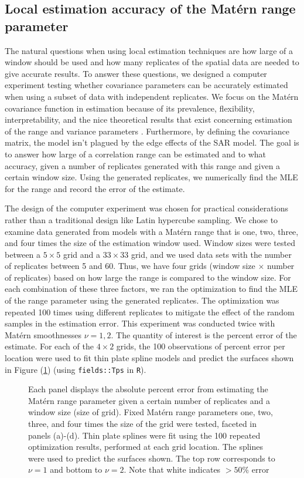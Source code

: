 \documentclass[review]{elsarticle}
\begin{document}
\subsection{Local estimation accuracy of the Mat\'ern range parameter}
\label{ss:2}

The natural questions when using local estimation techniques are how large of a window should be used and how many replicates of the spatial data are needed to give accurate results. To answer these questions, we designed a computer experiment testing whether covariance parameters can be accurately estimated when using a subset of data with independent replicates. We focus on the Mat\'ern covariance function in estimation because of its prevalence, flexibility, interpretability,  and the nice theoretical results that exist concerning estimation of the range and variance parameters \cite{kaufman2013role}. Furthermore, by defining the covariance matrix, the model isn't plagued by the edge effects of the SAR model. The goal is to answer how large of a correlation range can be estimated and to what accuracy, given a number of replicates generated with this range and given a certain window size. Using the generated replicates, we numerically find the MLE for the range and record the error of the estimate. 

The design of the computer experiment was chosen for practical considerations rather than a traditional design like Latin hypercube sampling. We chose to examine data generated from models with a Mat\'ern range that is one, two, three, and four times the size of the estimation window used. Window sizes were tested between a $5 \times 5$ grid and a $33 \times 33$ grid, and we used data sets with the number of replicates between 5 and 60. Thus, we have four grids (window size $\times$ number of replicates) based on how large the range is compared to the window size. For each combination of these three factors, we ran the optimization to find the MLE of the range parameter using the generated replicates. The optimization was repeated 100 times using different replicates to mitigate the effect of the random samples in the estimation error. This experiment was conducted twice with Mat\'ern smoothnesses $\nu =1, 2$. The quantity of interest is the percent error of the estimate. For each of the $4\times2$ grids, the 100 observations of percent error per location were used to fit thin plate spline models and predict the surfaces shown in Figure (\ref{f:2}) (using \texttt{fields::Tps} in \texttt{R}). 

\begin{figure}
    \centering
    \caption{Each panel displays the absolute percent error from estimating the Mat\'ern range parameter given a certain number of replicates and a window size (size of grid). Fixed Mat\'ern range parameters one, two, three, and four times the size of the grid were tested, faceted in panels (a)-(d). Thin plate splines were fit using the 100 repeated optimization results, performed at each grid location. The splines were used to predict the surfaces shown. The top row corresponds to $\nu=1$ and bottom to $\nu=2$. Note that white indicates $>50\%$ error}
    \label{f:2}
\end{figure}
\end{document}
